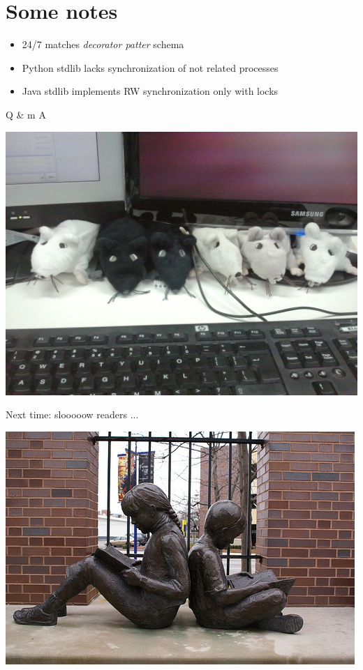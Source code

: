 \documentclass{beamer}
\begin{document}
\section{Some notes}

\begin{frame}
\begin{itemize}
 \item 24/7 matches \emph{decorator patter} schema
 \item Python stdlib lacks synchronization of not related processes
 \item Java stdlib implements RW synchronization only with locks
\end{itemize}
\end{frame}

\begin{frame}
\begin{center}
\Huge{Q \& m A}

\includegraphics[scale=0.1]{../common/questions.jpg}

\end{center}

\end{frame}

\begin{frame}

Next time: slooooow readers ...

\begin{center}
\includegraphics[scale=0.5]{slow_readers.jpg} 

\end{center}
\end{frame}
\end{document}
